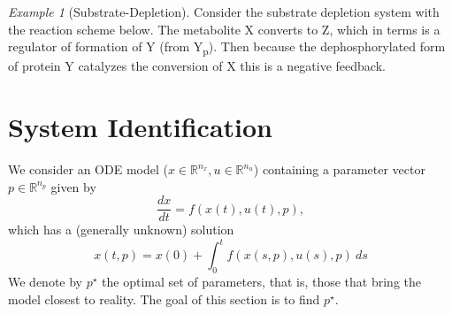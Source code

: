 \documentclass[a4paper]{article}
\theoremstyle{plain}
\theoremstyle{definition}
\theoremstyle{remark}
\newtheorem*{example}{Example}
\begin{document}
\begin{example}[Substrate-Depletion]
  Consider the substrate depletion system with the reaction scheme below. The
  metabolite X converts to Z, which in terms is a regulator of formation of Y
  (from Y\textsubscript{p}). Then because the dephosphorylated form of protein
  Y catalyzes the conversion of X this is a negative feedback.
  \begin{center}
  \end{center}
\end{example}


\section{System Identification}

We consider an ODE model ($x \in \mathbb{R}^{n_x}, u \in \mathbb{R}^{n_u}$)
containing a parameter vector $p \in \mathbb{R}^{n_p}$ given by
\begin{equation} \label{eqn:dynamics-p}
  \frac{dx}{dt} = f(x(t), u(t), p),
\end{equation}
which has a (generally unknown) solution
\begin{equation} \label{eqn:sol-p}
  x(t, p) = x(0) + \int_0^t f(x(s, p), u(s), p) ~ ds
\end{equation}
We denote by $p^\star$ the optimal set of parameters, that is, those that
bring the model closest to reality. The goal of this section is to find
$p^\star$.
\end{document}
